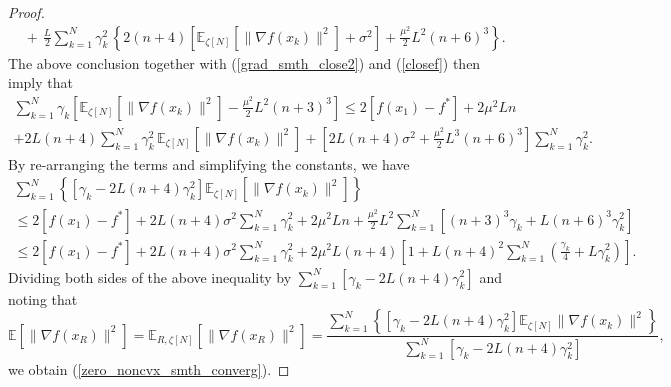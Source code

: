 \documentclass[final]{siamltex}
\newcommand{\beq}{\begin{equation}}
\newcommand{\eeq}{\end{equation}}
\newcommand{\nn}{\nonumber}
\def\eqnok#1{(\ref{#1})}
\newcommand{\bbe}{\mathbb{E}}
\begin{document}
\begin{proof}
\[\begin{array}{l}
\ \ \ + \, \frac{L}{2} \sum\limits_{k=1}^N \gamma_k^2 \, \left \{2(n+4) \left [\bbe_{\zeta[N]}
[\|\nabla f(x_k)\|^2] + \sigma^2\right]+ \frac{\mu^2}{2} L^2 (n+6)^3 \right \}.
\end{array}
\]
The above conclusion together with \eqnok{grad_smth_close2}
and \eqnok{closef} then imply that
\beq \label{zero_noncvx_smth_cnvg5}
\begin{array}{l}
\sum_{k=1}^N \gamma_k \left[\bbe_{\zeta[N]}[\| \nabla f(x_k)\|^2] - \frac{\mu^2}{2}L^2(n+3)^3 \right]
\le 2 \left[f(x_1) - f^* \right] + 2 \mu^2 L n \\
+ 2L (n+4) \sum_{k=1}^N \gamma_k^2 \, \bbe_{\zeta[N]}[\|\nabla f(x_k)\|^2]
+ \left[2L(n+4) \sigma^2 + \frac{\mu^2}{2} L^3(n+6)^3 \right] \sum_{k=1}^N \gamma_k^2.
\end{array}
\eeq
By re-arranging the terms and simplifying the constants, we have
\beq \label{zero_noncvx_smth_cnvg6}
\begin{array}{l}
\sum_{k=1}^N \left \{\left[\gamma_k - 2 L (n+4)\gamma_k^2 \right]
\bbe_{\zeta[N]}[\|\nabla f(x_k)\|^2] \right\}
\\
\le
2 \left[f(x_1) - f^* \right] + 2 L(n+4)\sigma^2 \sum_{k=1}^N \gamma_k^2 + 2 \mu^2 L n +
\frac{\mu^2}{2} L^2 \sum_{k=1}^N \left[(n+3)^3\gamma_k + L(n+6)^3\gamma_k^2 \right] \\
\le
2 \left[f(x_1) - f^* \right] + 2 L(n+4)\sigma^2 \sum_{k=1}^N \gamma_k^2 +
2 \mu^2 L (n+4) \left[1+ L(n+4)^2 \sum_{k=1}^N (\frac{\gamma_k}{4} +L \gamma_k^2)\right].
\end{array}
\eeq
Dividing both sides of the above inequality by
$\sum_{k=1}^N \left[\gamma_k - 2 L (n+4) \gamma_k^2 \right]$ and
noting that
\[
\bbe[\|\nabla f(x_R)\|^2] = \bbe_{R, \zeta[N]}[\|\nabla f(x_R)\|^2] =
\frac{\sum_{k=1}^N \left\{\left[\gamma_k - 2 L(n+4) \gamma_k^2\right] \bbe_{\zeta[N]}\|\nabla f(x_k)\|^2 \right\}}
{\sum_{k=1}^N \left[\gamma_k - 2 L(n+4) \gamma_k^2\right]},
\]
we obtain \eqnok{zero_noncvx_smth_converg}.


\end{proof}
\end{document}
